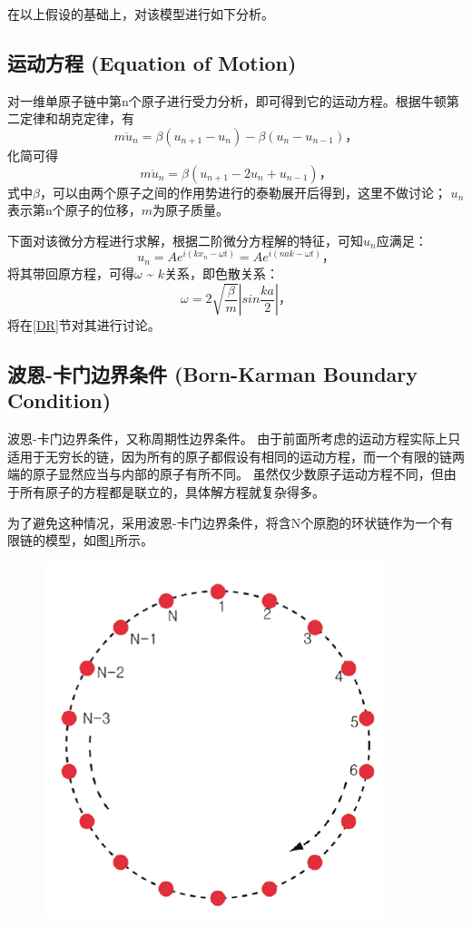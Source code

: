 \documentclass[declarePage]{ecnuthesis}
\begin{document}
在以上假设的基础上，对该模型进行如下分析。

\subsection{运动方程 (Equation of Motion)}

对一维单原子链中第n个原子进行受力分析，即可得到它的运动方程。根据牛顿第二定律和胡克定律，有
\begin{equation}
    m \ddot{u}_n = \beta (u_{n+1} - u_n) - \beta (u_n - u_{n-1}) \text{，}
\end{equation}
化简可得
\begin{equation}
    m \ddot{u}_n = \beta (u_{n+1} - 2u_n + u_{n-1}) \text{，}
\end{equation}
式中$\beta$，可以由两个原子之间的作用势进行的泰勒展开后得到，这里不做讨论；%
$u_n$表示第n个原子的位移，$m$为原子质量。

下面对该微分方程进行求解，根据二阶微分方程解的特征，可知$u_n$应满足：
\begin{equation}
    u_n = A e^{i(kx_n - \omega t)} = A e^{i(nak - \omega t)} \text{，} \label{EOM}
\end{equation}
将其带回原方程，可得$\omega$ \~{} $k$关系，即色散关系：
\begin{equation}
    \omega = 2 \sqrt{\frac{\beta}{m}} \left | sin \frac{ka}{2} \right | \text{，} \label{DRE}
\end{equation}
将在\ref{DR}节对其进行讨论。

\subsection{波恩-卡门边界条件 (Born-Karman Boundary Condition)}
波恩-卡门边界条件，又称周期性边界条件。%
由于前面所考虑的运动方程实际上只适用于无穷长的链，因为所有的原子都假设有相同的运动方程，而一个有限的链两端的原子显然应当与内部的原子有所不同。%
虽然仅少数原子运动方程不同，但由于所有原子的方程都是联立的，具体解方程就复杂得多。

为了避免这种情况，采用波恩-卡门边界条件，将含N个原胞的环状链作为一个有限链的模型，如图\ref{BKBC}所示。
\begin{figure}[htb]
    \centering
    \includegraphics[width=.5\textwidth]{BKBC.png}
    \label{BKBC}
\end{figure}
\end{document}

